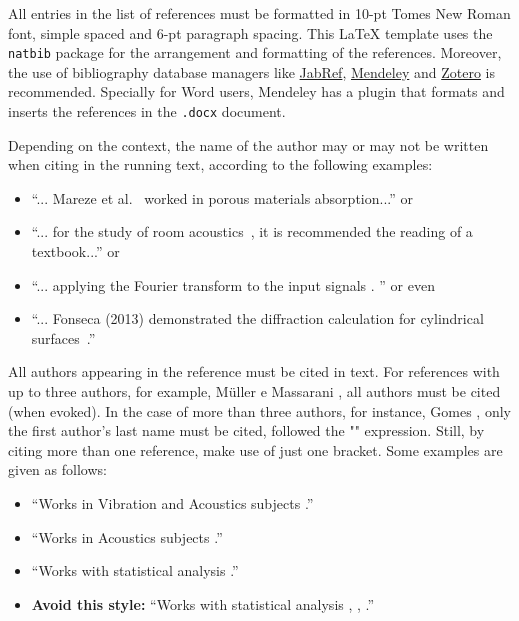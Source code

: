 \documentclass[12pt, a4paper, twoside, twocolumn]{article}
\begin{document}
All entries in the list of references must be formatted in 10-pt Tomes New Roman font, simple spaced and 6-pt paragraph spacing. This \LaTeX\xspace template uses the \texttt{natbib} package for the arrangement and formatting of the references. Moreover, the use of bibliography database managers like \href{http://www.jabref.org/}{JabRef}, \href{http://www.mendeley.com}{Mendeley} and \href{https://www.zotero.org/}{Zotero} is recommended. Specially for Word users, Mendeley has a plugin that formats and inserts the references in the \texttt{.docx} document.

Depending on the context, the name of the author may or may not be written when citing in the running text, according to the following examples:

\begin{itemize}[noitemsep,topsep=0ex] \itemsep=4pt
	\item 	``... Mareze et al.~\cite{Mareze-2019} worked in porous materials absorption...'' or
	\item ``... for the study of room acoustics~\cite{Brandao-2017}, it is recommended the reading of a textbook...'' or
	\item ``... applying the Fourier transform to the input signals \cite{Oppenheim-2010}. '' or even
	\item ``... Fonseca (2013) demonstrated the diffraction calculation for cylindrical surfaces~\cite{Fonseca-2013}.''
\end{itemize}

All authors appearing in the reference must be cited in text. 
For references with up to three authors, for example,  Müller e Massarani \cite{Muller-2001}, all authors must be cited (when evoked). In the case of more than three authors, for instance, Gomes \etal \cite{Gomes-2015}, only the first author's last name must be cited, followed the "\etal" expression. Still, by citing more than one reference, make use of just one bracket. Some examples are given as follows:

\begin{itemize}[noitemsep,topsep=0ex] \itemsep=8pt
	\item 	``Works in Vibration and Acoustics subjects \cite{Mareze-2017,Fonseca-2013,Brandao-2017}.''
	\item ``Works in Acoustics subjects \cite{Mareze-2017,Oppenheim-2010,Muller-2001,Mareze-2019}.''
	\item ``Works with statistical analysis \cite{Mareze-2017, Brandao-2017, Borges-2018}.''
	\item \textbf{Avoid this style:} ``Works with statistical analysis \cite{Mareze-2017}, \cite{Brandao-2017}, \cite{Ristow-2016}.''
\end{itemize}
\end{document}
